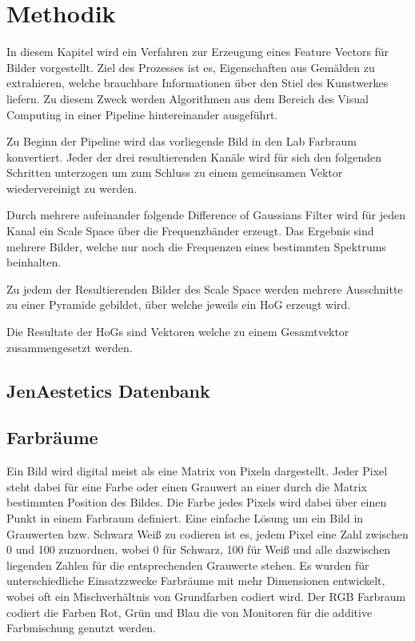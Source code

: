 \chapter{Methodik}

In diesem Kapitel wird ein Verfahren zur Erzeugung eines Feature Vectors für Bilder vorgestellt. Ziel des Prozesses ist es, Eigenschaften aus Gemälden zu extrahieren, welche brauchbare Informationen über den Stiel des Kunstwerkes liefern. Zu diesem Zweck werden Algorithmen aus dem Bereich des Visual Computing in einer Pipeline hintereinander ausgeführt.

Zu Beginn der Pipeline wird das vorliegende Bild in den Lab Farbraum konvertiert. Jeder der drei resultierenden Kanäle wird für sich den folgenden Schritten unterzogen um zum Schluss zu einem gemeinsamen Vektor wiedervereinigt zu werden.

Durch mehrere aufeinander folgende Difference of Gaussians Filter wird für jeden Kanal ein Scale Space über die Frequenzbänder erzeugt. Das Ergebnis sind mehrere Bilder, welche nur noch die Frequenzen eines bestimmten Spektrums beinhalten.

Zu jedem der Resultierenden Bilder des Scale Space werden mehrere Ausschnitte zu einer Pyramide gebildet, über welche jeweils ein \ac{HoG} erzeugt wird. 

Die Resultate der \ac{HoG}s sind Vektoren welche zu einem Gesamtvektor zusammengesetzt werden.

\section{JenAestetics Datenbank}

\blindtext

\section{Farbräume}

Ein Bild wird digital meist als eine Matrix von Pixeln dargestellt. Jeder Pixel steht dabei für eine Farbe oder einen Grauwert an einer durch die Matrix bestimmten Position des Bildes. Die Farbe jedes Pixels wird dabei über einen Punkt in einem Farbraum definiert.
Eine einfache Lösung um ein Bild in Grauwerten bzw. Schwarz Weiß zu codieren ist es, jedem Pixel eine Zahl zwischen 0 und 100 zuzuordnen, wobei 0 für Schwarz, 100 für Weiß und alle dazwischen liegenden Zahlen für die entsprechenden Grauwerte stehen.
Es wurden für unterschiedliche Einsatzzwecke Farbräume mit mehr Dimensionen entwickelt, wobei oft ein Mischverhältnis von Grundfarben codiert wird.  
Der RGB Farbraum codiert die Farben Rot, Grün und Blau die von Monitoren für die additive Farbmischung genutzt werden.

